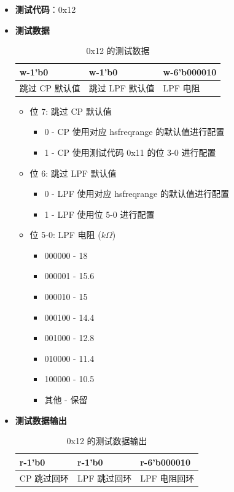 \documentclass[main\_\_CN.tex]{subfiles}
\begin{document}
\begin{itemize}
    \item \textbf{测试代码}：0x12
    \item \textbf{测试数据}
        \begin{longtable}{ |p{4cm}|p{4cm}|p{4cm}|}
            \caption{0x12 的测试数据}
            \label{tab:test-data-0x12} \\
            \hline
            \rowcolor{lightgray}
            \textbf{w-1'b0} & \textbf{w-1'b0} & \textbf{w-6'b000010} \\ \hline
            跳过 CP 默认值 & 跳过 LPF 默认值 & LPF 电阻  \\ \hline
        \end{longtable}
        \begin{itemize}
            \item 位 7: 跳过 CP 默认值
                \begin{itemize}
                    \item 0 - CP 使用对应 hsfreqrange 的默认值进行配置
                    \item 1 - CP 使用测试代码 0x11 的位 3-0 进行配置
                \end{itemize}
            \item 位 6: 跳过 LPF 默认值
                \begin{itemize}
                    \item 0 - LPF 使用对应 hsfreqrange 的默认值进行配置
                    \item 1 - LPF 使用位 5-0 进行配置
                \end{itemize}
            \item 位 5-0: LPF 电阻 ($k\Omega$)
                \begin{itemize}
                    \item 000000 - 18
                    \item 000001 - 15.6
                    \item 000010 - 15
                    \item 000100 - 14.4
                    \item 001000 - 12.8
                    \item 010000 - 11.4
                    \item 100000 - 10.5
                    \item 其他 - 保留
                \end{itemize}
        \end{itemize}
    \item \textbf{测试数据输出}
        \begin{longtable}{ |p{4cm}|p{4cm}|p{4cm}|}
            \caption{0x12 的测试数据输出}
            \label{tab:test-dout-0x12} \\
            \hline
            \rowcolor{lightgray}
            \textbf{r-1'b0} & \textbf{r-1'b0} & \textbf{r-6'b000010} \\ \hline
            CP 跳过回环 & LPF 跳过回环 & LPF 电阻回环 \\ \hline
        \end{longtable}
\end{itemize}
\end{document}
